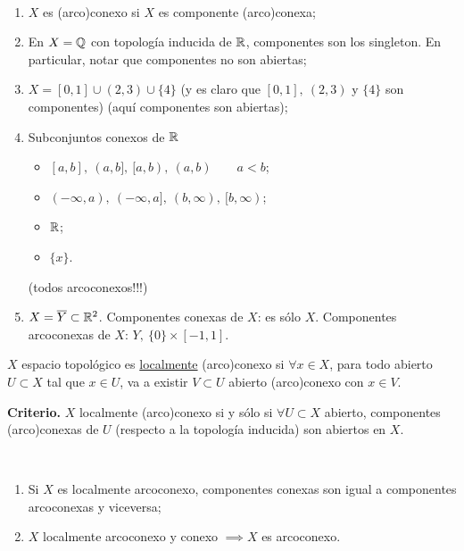\begin{eg}~
	\begin{enumerate}
		\item $X$ es (arco)conexo si $X$ es componente (arco)conexa;

		\item En $X = \mathbb{Q}$ con topología inducida de $\mathbb{R}$, componentes son los singleton. En particular, notar que componentes no son abiertas;

		\item $X = [0,1] \cup (2,3) \cup \{4\}$ (y es claro que $[0,1],\ (2,3)$ y $\{4\}$ son componentes) (aquí componentes son abiertas);

		\item Subconjuntos conexos de $\mathbb{R}$
		\begin{itemize}
			\item $[a,b],\ (a,b],\ [a,b),\ (a,b) \qquad a<b$;

			\item $(-\infty,a),\ (-\infty,a],\ (b,\infty),\ [b,\infty)$;

			\item $\mathbb{R}$;

			\item $\{x\}$.  
		\end{itemize}
		(todos arcoconexos!!!)

		\item $X = \overline{Y} \subset \mathbb{R}^2$. Componentes conexas de $X$: es sólo $X$. Componentes arcoconexas de $X$: $Y,\ \{0\} \times [-1,1]$.
	\end{enumerate}
\end{eg}

\begin{definition}
	$X$ espacio topológico es \uline{localmente} (arco)conexo si $\forall x \in X$, para todo abierto $U \subset X$ tal que $x \in U$, va a existir $V \subset U$ abierto (arco)conexo con $x \in V$.
\end{definition}
\text{}

\textbf{Criterio.} $X$ localmente (arco)conexo si y sólo si $\forall U \subset X$ abierto, componentes (arco)conexas de $U$ (respecto a la topología inducida) son abiertos en $X$.

\begin{corollary}~
	\begin{enumerate}
		\item Si $X$ es localmente arcoconexo, componentes conexas son igual a componentes arcoconexas y viceversa;

		\item $X$ localmente arcoconexo y conexo $\implies X$ es arcoconexo.
	\end{enumerate}
\end{corollary}
